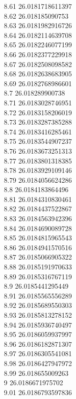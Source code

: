 {8.61	26.0181718611397\\
8.62	26.018185090753\\
8.63	26.0181982916726\\
8.64	26.0182114639708\\
8.65	26.0182246077199\\
8.66	26.0182377229918\\
8.67	26.0182508098582\\
8.68	26.0182638683905\\
8.69	26.0182768986601\\
8.7	26.018289900738\\
8.71	26.0183028746951\\
8.72	26.0183158206019\\
8.73	26.0183287385288\\
8.74	26.0183416285461\\
8.75	26.0183544907237\\
8.76	26.0183673251313\\
8.77	26.0183801318385\\
8.78	26.0183929109146\\
8.79	26.0184056624286\\
8.8	26.0184183864496\\
8.81	26.0184310830461\\
8.82	26.0184437522867\\
8.83	26.0184563942396\\
8.84	26.0184690089728\\
8.85	26.0184815965543\\
8.86	26.0184941570516\\
8.87	26.0185066905322\\
8.88	26.0185191970633\\
8.89	26.0185316767119\\
8.9	26.0185441295449\\
8.91	26.0185565556289\\
8.92	26.0185689550303\\
8.93	26.0185813278152\\
8.94	26.0185936740497\\
8.95	26.0186059937997\\
8.96	26.0186182871307\\
8.97	26.0186305541081\\
8.98	26.0186427947972\\
8.99	26.018655009263\\
9	26.0186671975702\\
9.01	26.0186793597836\\
}

